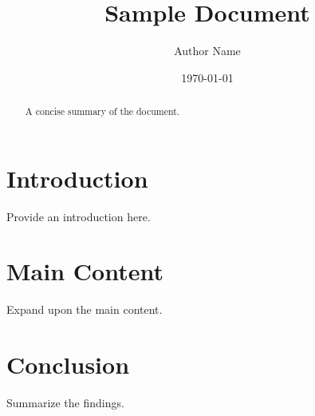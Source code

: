 \documentclass[12pt]{article}
\title{Sample Document}
\author{Author Name}
\date{\today}
\begin{document}
\maketitle

\begin{abstract}
A concise summary of the document.
\end{abstract}

\section{Introduction}
Provide an introduction here.

\section{Main Content}
Expand upon the main content.

\section{Conclusion}
Summarize the findings.



\end{document}
